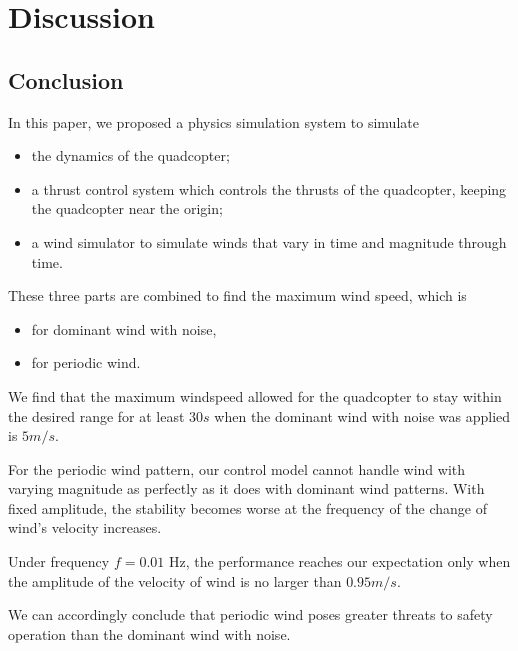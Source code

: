 \section{Discussion}
\subsection{Conclusion}
In this paper, we proposed a physics simulation system to simulate
\begin{itemize}
    \item the dynamics of the quadcopter;
    \item a thrust control system which controls the thrusts of the quadcopter, keeping the quadcopter near the origin;
    \item a wind simulator to simulate winds that vary in time and magnitude through time.
\end{itemize}

These three parts are combined to find the maximum wind speed, which is
\begin{itemize}
    \item for dominant wind with noise,
    \item for periodic wind.
\end{itemize}

We find that the maximum windspeed allowed for the quadcopter to stay within the desired range for at least $30s$ when the dominant wind with noise was applied is $5m/s$.

For the periodic wind pattern, our control model cannot handle wind with varying magnitude as perfectly as it does with dominant wind patterns. With fixed amplitude, the stability becomes worse at the frequency of the change of wind's velocity increases. 

Under frequency $f = 0.01$ Hz, the performance reaches our expectation only when the amplitude of the velocity of wind is no larger than $0.95 m/s$.

We can accordingly conclude that periodic wind poses greater threats to safety operation than the dominant wind with noise. 

